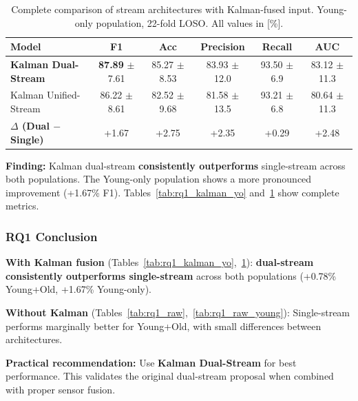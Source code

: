 \documentclass{article}
\begin{document}
\begin{table}[htbp]
    \centering
    \caption{Complete comparison of stream architectures with Kalman-fused input. Young-only population, 22-fold LOSO. All values in [\%].}
    \label{tab:rq1_kalman_young}
    \begin{tabular}{lccccc}
        \toprule
        \textbf{Model} & \textbf{F1} & \textbf{Acc} & \textbf{Precision} & \textbf{Recall} & \textbf{AUC} \\
        \midrule
        \textbf{Kalman Dual-Stream} & \textbf{87.89} $\pm$ 7.61 & 85.27 $\pm$ 8.53 & 83.93 $\pm$ 12.0 & 93.50 $\pm$ 6.9 & 83.12 $\pm$ 11.3 \\
        Kalman Unified-Stream & 86.22 $\pm$ 8.61 & 82.52 $\pm$ 9.68 & 81.58 $\pm$ 13.5 & 93.21 $\pm$ 6.8 & 80.64 $\pm$ 11.3 \\
        \midrule
        \textbf{$\Delta$ (Dual $-$ Single)} & +1.67 & +2.75 & +2.35 & +0.29 & +2.48 \\
        \bottomrule
    \end{tabular}
\end{table}

\textbf{Finding:} Kalman dual-stream \textbf{consistently outperforms} single-stream across both populations. The Young-only population shows a more pronounced improvement (+1.67\% F1). Tables~\ref{tab:rq1_kalman_yo} and~\ref{tab:rq1_kalman_young} show complete metrics.

\subsubsection{RQ1 Conclusion}

\begin{tcolorbox}[colback=blue!5,colframe=blue!50!black,title=\textbf{Answer to RQ1: Single-Stream vs Dual-Stream}]
\textbf{With Kalman fusion} (Tables~\ref{tab:rq1_kalman_yo},~\ref{tab:rq1_kalman_young}): \textbf{dual-stream consistently outperforms single-stream} across both populations (+0.78\% Young+Old, +1.67\% Young-only).

\textbf{Without Kalman} (Tables~\ref{tab:rq1_raw},~\ref{tab:rq1_raw_young}): Single-stream performs marginally better for Young+Old, with small differences between architectures.

\textbf{Practical recommendation:} Use \textbf{Kalman Dual-Stream} for best performance. This validates the original dual-stream proposal when combined with proper sensor fusion.
\end{tcolorbox}
\end{document}
